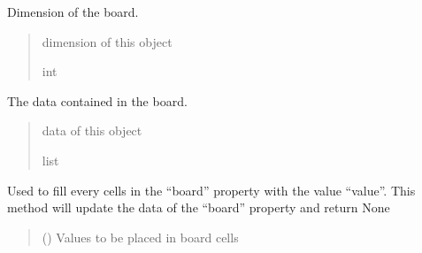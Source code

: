 \documentclass[letterpaper,10pt,english]{sphinxmanual}
\begin{document}
\begin{fulllineitems}
\begin{fulllineitems}
\label{\detokenize{board:board.Board.dim}}
\pysigstartsignatures
{}
\pysigstopsignatures
\sphinxAtStartPar
Dimension of the board.
\begin{quote}\begin{description}
\sphinxAtStartPar
dimension of this object

\sphinxAtStartPar
int

\end{description}\end{quote}

\end{fulllineitems}


\begin{fulllineitems}
\label{\detokenize{board:board.Board.board}}
\pysigstartsignatures
{}
\pysigstopsignatures
\sphinxAtStartPar
The data contained in the board.
\begin{quote}\begin{description}
\sphinxAtStartPar
data of this object

\sphinxAtStartPar
list

\end{description}\end{quote}

\end{fulllineitems}


\begin{fulllineitems}
\label{\detokenize{board:board.Board.fillBoardWithValue}}
\pysigstartsignatures
{}
\pysigstopsignatures
\sphinxAtStartPar
Used to fill every cells in the “board” property
with the value “value”. This method will update the
data of the “board” property and return None
\begin{quote}\begin{description}
\sphinxAtStartPar
{} () \textendash{} Values to be placed in board cells

\end{description}\end{quote}

\end{fulllineitems}


\end{fulllineitems}
\end{document}

